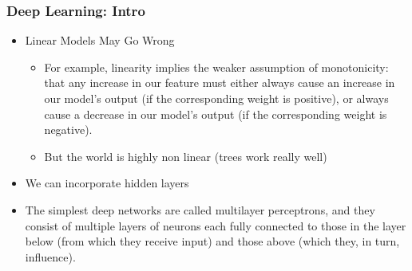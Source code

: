 \documentclass[
  shownotes,
  xcolor={svgnames},
  hyperref={colorlinks,citecolor=DarkBlue,linkcolor=DarkRed,urlcolor=DarkBlue}
  , aspectratio=169]{beamer}
\begin{document}
\begin{frame}
\frametitle{Deep Learning: Intro}

\begin{itemize} 
\item Linear Models May Go Wrong
\medskip
\begin{itemize}
\item For example, linearity implies the weaker assumption of monotonicity: that any increase in our feature must either always cause an increase in our model’s output (if the corresponding weight is positive), or always cause a decrease in our model’s output (if the corresponding weight is negative). 
\item But the world is highly non linear (trees work really well)
\end{itemize}
\medskip
\item We can incorporate hidden layers
\medskip
\item The simplest deep networks are called multilayer perceptrons, and they consist of multiple layers of neurons each fully connected to those in the layer below (from which they receive input) and those above (which they, in turn, influence). 

\end{itemize}
\end{frame}
\end{document}
